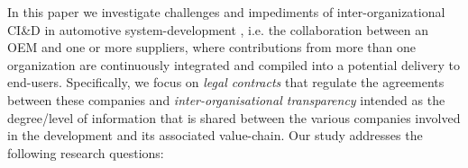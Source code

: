 In this paper we investigate %
challenges and impediments of inter-organizational CI\&D in automotive system-development
, i.e. the collaboration between an OEM and one or more suppliers, where contributions from more than one organization are continuously integrated and compiled into a potential delivery to end-users.
Specifically, we focus on {\em legal contracts} that regulate the agreements between these companies 
and {\em {inter-organisational} transparency} intended as the degree/level of information that is shared between the various companies %
involved in the development and its associated value-chain. %
Our study %
addresses the following research questions:

%

